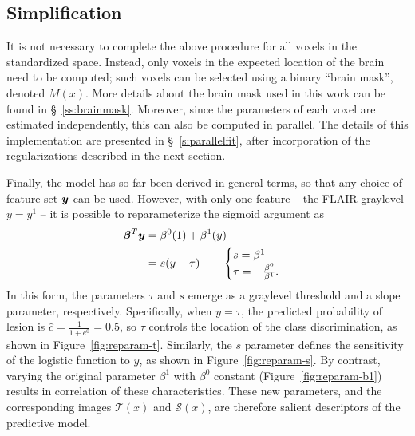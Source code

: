 \subsection{Simplification}\label{ss:vlr-simple}
It is not necessary to complete the above procedure for all voxels in the standardized space.
Instead, only voxels in the expected location of the brain need to be computed;
such voxels can be selected using a binary ``brain mask'', denoted $M(x)$.
More details about the brain mask used in this work can be found in \S~\ref{ss:brainmask}.
Moreover, since the parameters of each voxel are estimated independently,
this can also be computed in parallel.
The details of this implementation are presented in \S~\ref{s:parallelfit},
after incorporation of the regularizations described in the next section.
\par
Finally, the model has so far been derived in general terms,
so that any choice of feature set $\bm{y}$ can be used.
However, with only one feature -- the FLAIR graylevel $y = y^1$ --
it is possible to reparameterize the sigmoid argument as
\begin{align}
  \bb^T\by &= \b^0(1) + \b^1(y)\nonumber\\
           &= s(y-\tau)
           \qquad\begin{cases}
             s = \b^1\\
             \tau = -\frac{\b^0}{\b^1}.
           \end{cases}%
  \label{eq:reparameterize}
\end{align}
In this form, the parameters $\tau$ and $s$ emerge
as a graylevel threshold and a slope parameter, respectively.
Specifically, when $y = \tau$,
the predicted probability of lesion is $\hat{c} = \tfrac{1}{1+e^{0}} = 0.5$,
so $\tau$ controls the location of the class discrimination,
as shown in Figure~\ref{fig:reparam-t}.
Similarly, the $s$ parameter defines the sensitivity of the logistic function to $y$,
as shown in Figure~\ref{fig:reparam-s}.
By contrast, varying the original parameter $\beta^1$ with $\beta^0$ constant
(Figure~\ref{fig:reparam-b1}) results in correlation of these characteristics.
These new parameters, and the corresponding images $\mathcal{T}(x)$ and $\mathcal{S}(x)$,
are therefore salient descriptors of the predictive model.
